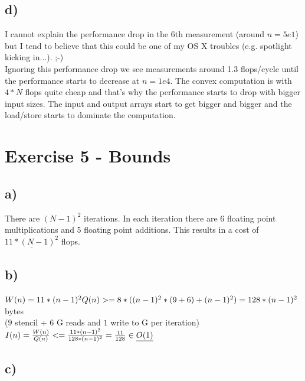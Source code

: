 \documentclass[10pt,a4paper,oneside,notitlepage]{report}
\begin{document}
\subsection*{d)}
I cannot explain the performance drop in the 6th measurement (around $n=5e1$) but I tend to believe that this could be one of my OS X troubles (e.g. spotlight kicking in...). ;-) \\
Ignoring this performance drop we see measurements around 1.3 flops/cycle until the performance starts to decrease at $n=1e4$. The convex computation is with $4*N$ flops quite cheap and that's why the performance starts to drop with bigger input sizes. The input and output arrays start to get bigger and bigger and the load/store starts to dominate the computation.

\section*{Exercise 5 - Bounds}
\subsection*{a)}
There are $(N-1)^2$ iterations. In each iteration there are 6 floating point multiplications and 5 floating point additions. This results in a cost of $\underline{11*(N-1)^2}$ flops.
\subsection*{b)}
$W(n) = 11*(n-1)^2 \\
Q(n) >= 8*((n-1)^2*(9 + 6) + (n-1)^2 ) = 128*(n-1)^2$  bytes \\($9$ stencil + $6$ G reads and $1$ write to G per iteration) \\
$I(n) = {W(n) \over Q(n)} <= {11*(n-1)^2 \over 128*(n-1)^2} = {11 \over 128} \in \underline{O(1)}$
\subsection*{c)}
\end{document}
